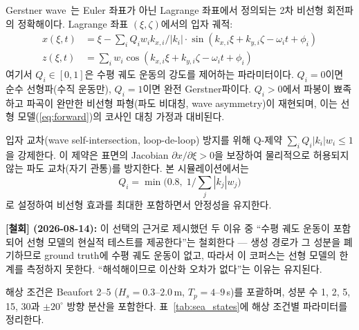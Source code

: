 \documentclass[11pt]{report}
\numberwithin{equation}{chapter}
\numberwithin{figure}{chapter}
\numberwithin{table}{chapter}
\begin{document}
Gerstner wave~\citep{Gerstner1802}는 Euler 좌표가 아닌
Lagrange 좌표에서 정의되는 2차 비선형 회전파의 정확해이다.
Lagrange 좌표 $(\xi, \zeta)$에서의 입자 궤적:
\begin{align}
  x(\xi, t) &= \xi - \sum_i Q_i w_i k_{x,i} / |k_i| \cdot \sin(k_{x,i}\xi + k_{y,i}\zeta - \omega_i t + \phi_i)
  \label{eq:gerstner_x} \\
  z(\xi, t) &= \sum_i w_i \cos(k_{x,i}\xi + k_{y,i}\zeta - \omega_i t + \phi_i)
  \label{eq:gerstner_z}
\end{align}
여기서 $Q_i \in [0, 1]$은 수평 궤도 운동의 강도를 제어하는 파라미터이다.
$Q_i = 0$이면 순수 선형파(수직 운동만), $Q_i = 1$이면 완전 Gerstner파이다.
$Q_i > 0$에서 파봉이 뾰족하고 파곡이 완만한 비선형 파형(파도 비대칭, wave asymmetry)이 재현되며,
이는 선형 모델(\ref{eq:forward})의 코사인 대칭 가정과 대비된다.

입자 교차(wave self-intersection, loop-de-loop) 방지를 위해
Q-제약 $\sum_i Q_i |k_i| w_i \leq 1$을 강제한다.
이 제약은 표면의 Jacobian $\partial x / \partial \xi > 0$을 보장하여
물리적으로 허용되지 않는 파도 교차(자기 관통)를 방지한다.
본 시뮬레이션에서는
\[
Q_i = \min\!\bigl(0.8,\; 1/{\textstyle\sum_j |k_j| w_j}\bigr)
\]
로 설정하여 비선형 효과를 최대한 포함하면서 안정성을 유지한다.

\textbf{[철회] (2026-08-14):} 이 선택의 근거로 제시했던 두 이유 중
``수평 궤도 운동이 포함되어 선형 모델의 현실적 테스트를 제공한다''는
철회한다 --- 생성 경로가 그 성분을 폐기하므로 ground truth에 수평 궤도 운동이 없고,
따라서 이 코퍼스는 선형 모델의 한계를 측정하지 못한다.
``해석해이므로 이산화 오차가 없다''는 이유는 유지된다.

해상 조건은 Beaufort 2--5 ($H_s = 0.3$--$2.0$\,m, $T_p = 4$--$9$\,s)를 포괄하며,
성분 수 1, 2, 5, 15, 30과 $\pm 20^\circ$ 방향 분산을 포함한다.
표~\ref{tab:sea_states}에 해상 조건별 파라미터를 정리한다.

\begin{table}[htbp]
\centering
\caption{시뮬레이션 해상 조건 파라미터. $\lambda_p$: 피크 파장,
$c_p$: 위상 속도, $c_g$: 군속도 (수심 50\,m).}
\label{tab:sea_states}

\end{table}
\end{document}
